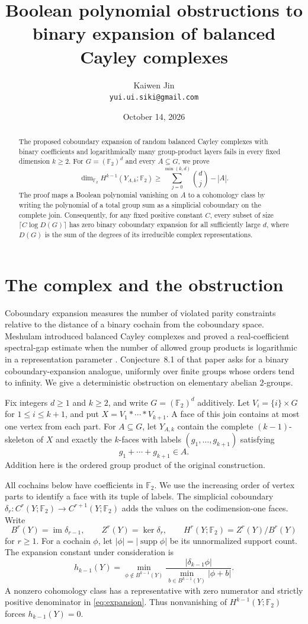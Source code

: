 \documentclass[11pt]{article}
\title{Boolean polynomial obstructions to binary expansion\newline
of balanced Cayley complexes}
\author{Kaiwen Jin\\\small\texttt{yui.ui.siki@gmail.com}}
\date{October 14, 2026}
\newcommand{\F}{\mathbb F_2}
\newcommand{\supp}{\operatorname{supp}}
\newcommand{\im}{\operatorname{im}}
\begin{document}
\maketitle

\begin{abstract}
The proposed coboundary expansion of random balanced Cayley complexes
with binary coefficients and logarithmically many group-product layers
fails in every fixed dimension $k\ge2$. For $G=(\F)^d$ and every
$A\subseteq G$, we prove
\[
\dim_{\F}H^{k-1}(Y_{A,k};\F)
\ge \sum_{j=0}^{\min(k,d)}\binom dj-|A|.
\]
The proof maps a Boolean polynomial vanishing on $A$ to a cohomology class
by writing the polynomial of a total group sum as a simplicial coboundary
on the complete join. Consequently, for any fixed positive constant $C$,
every subset of size $\lceil C\log D(G)\rceil$ has zero binary coboundary
expansion for all sufficiently large $d$, where $D(G)$ is the sum of the
degrees of its irreducible complex representations.
\end{abstract}

\section{The complex and the obstruction}

Coboundary expansion measures the number of violated parity constraints
relative to the distance of a binary cochain from the coboundary space.
Meshulam introduced balanced Cayley complexes and proved a real-coefficient
spectral-gap estimate when the number of allowed group products is
logarithmic in a representation parameter \cite{meshulam}.
Conjecture~8.1 of that paper asks for a binary coboundary-expansion analogue,
uniformly over finite groups whose orders tend to infinity.
We give a deterministic obstruction on elementary abelian $2$-groups.

Fix integers $d\ge1$ and $k\ge2$, and write $G=(\F)^d$ additively.
Let $V_i=\{i\}\times G$ for $1\le i\le k+1$, and put
$X=V_1*\cdots*V_{k+1}$. A face of this join contains at most one vertex
from each part. For $A\subseteq G$, let $Y_{A,k}$ contain the complete
$(k-1)$-skeleton of $X$ and exactly the $k$-faces with labels
$(g_1,\ldots,g_{k+1})$ satisfying
\[
g_1+\cdots+g_{k+1}\in A.
\]
Addition here is the ordered group product of the original construction.

All cochains below have coefficients in $\F$. We use the increasing order
of vertex parts to identify a face with its tuple of labels.
The simplicial coboundary $\delta_r:C^r(Y;\F)\to C^{r+1}(Y;\F)$ adds the
values on the codimension-one faces. Write
\[
B^r(Y)=\im\delta_{r-1},\qquad
Z^r(Y)=\ker\delta_r,\qquad H^r(Y;\F)=Z^r(Y)/B^r(Y)
\]
for $r\ge1$. For a cochain $\phi$, let $|\phi|=|\supp\phi|$ be its
unnormalized support count. The expansion constant under consideration is
\begin{equation}\label{eq:expansion}
h_{k-1}(Y)=\min_{\phi\notin B^{k-1}(Y)}
\frac{|\delta_{k-1}\phi|}{\min_{b\in B^{k-1}(Y)}|\phi+b|}.
\end{equation}
A nonzero cohomology class has a representative with zero numerator and
strictly positive denominator in \eqref{eq:expansion}. Thus nonvanishing
of $H^{k-1}(Y;\F)$ forces $h_{k-1}(Y)=0$.
\end{document}
